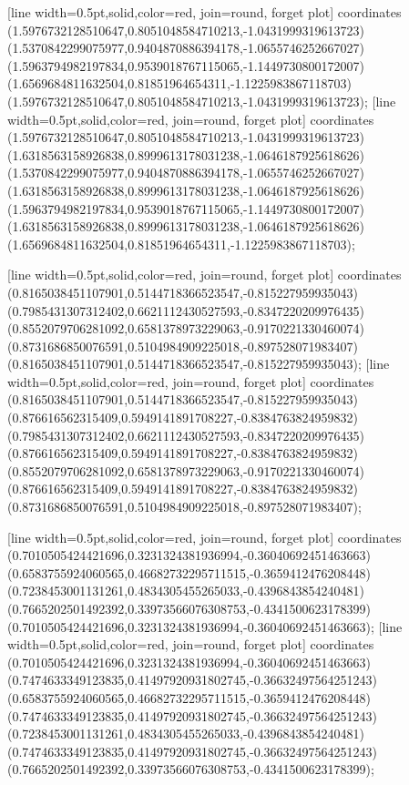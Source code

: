 [line width=0.5pt,solid,color=red, join=round, forget plot] coordinates {(1.5976732128510647,0.8051048584710213,-1.0431999319613723) (1.5370842299075977,0.9404870886394178,-1.0655746252667027) (1.5963794982197834,0.9539018767115065,-1.1449730800172007) (1.6569684811632504,0.81851964654311,-1.1225983867118703) (1.5976732128510647,0.8051048584710213,-1.0431999319613723)};
[line width=0.5pt,solid,color=red, join=round, forget plot] coordinates {(1.5976732128510647,0.8051048584710213,-1.0431999319613723) (1.6318563158926838,0.8999613178031238,-1.0646187925618626) (1.5370842299075977,0.9404870886394178,-1.0655746252667027) (1.6318563158926838,0.8999613178031238,-1.0646187925618626) (1.5963794982197834,0.9539018767115065,-1.1449730800172007) (1.6318563158926838,0.8999613178031238,-1.0646187925618626) (1.6569684811632504,0.81851964654311,-1.1225983867118703)};

[line width=0.5pt,solid,color=red, join=round, forget plot] coordinates {(0.8165038451107901,0.5144718366523547,-0.815227959935043) (0.7985431307312402,0.6621112430527593,-0.8347220209976435) (0.8552079706281092,0.6581378973229063,-0.9170221330460074) (0.8731686850076591,0.5104984909225018,-0.897528071983407) (0.8165038451107901,0.5144718366523547,-0.815227959935043)};
[line width=0.5pt,solid,color=red, join=round, forget plot] coordinates {(0.8165038451107901,0.5144718366523547,-0.815227959935043) (0.876616562315409,0.5949141891708227,-0.8384763824959832) (0.7985431307312402,0.6621112430527593,-0.8347220209976435) (0.876616562315409,0.5949141891708227,-0.8384763824959832) (0.8552079706281092,0.6581378973229063,-0.9170221330460074) (0.876616562315409,0.5949141891708227,-0.8384763824959832) (0.8731686850076591,0.5104984909225018,-0.897528071983407)};

[line width=0.5pt,solid,color=red, join=round, forget plot] coordinates {(0.7010505424421696,0.3231324381936994,-0.36040692451463663) (0.6583755924060565,0.46682732295711515,-0.3659412476208448) (0.7238453001131261,0.4834305455265033,-0.4396843854240481) (0.7665202501492392,0.33973566076308753,-0.4341500623178399) (0.7010505424421696,0.3231324381936994,-0.36040692451463663)};
[line width=0.5pt,solid,color=red, join=round, forget plot] coordinates {(0.7010505424421696,0.3231324381936994,-0.36040692451463663) (0.7474633349123835,0.41497920931802745,-0.36632497564251243) (0.6583755924060565,0.46682732295711515,-0.3659412476208448) (0.7474633349123835,0.41497920931802745,-0.36632497564251243) (0.7238453001131261,0.4834305455265033,-0.4396843854240481) (0.7474633349123835,0.41497920931802745,-0.36632497564251243) (0.7665202501492392,0.33973566076308753,-0.4341500623178399)};

